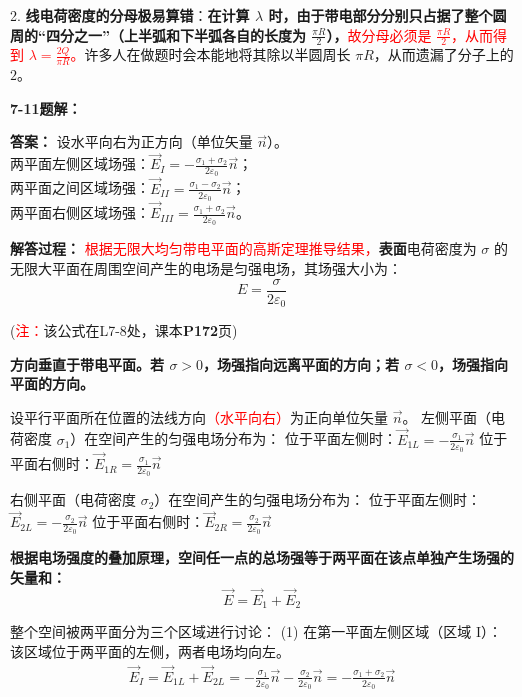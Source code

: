 2. \textbf{线电荷密度的分母极易算错}：\textbf{在计算 $\lambda$ 时，由于带电部分分别只占据了整个圆周的“四分之一”（上半弧和下半弧各自的长度为 $\frac{\pi R}{2}$），}\textcolor{red}{故分母必须是 $\frac{\pi R}{2}$，从而得到 $\lambda = \frac{2Q}{\pi R}$。}许多人在做题时会本能地将其除以半圆周长 $\pi R$，从而遗漏了分子上的 $2$。

\vspace{2em}

\textbf{7-11题解： }
\setcounter{equation}{0}
\renewcommand{\theHequation}{7-11.\arabic{equation}}

\textbf{答案： }
设水平向右为正方向（单位矢量 $\vec{n}$）。\\
两平面左侧区域场强：$\vec{E}_I = -\frac{\sigma_1 + \sigma_2}{2\varepsilon_0}\vec{n}$；\\
两平面之间区域场强：$\vec{E}_{II} = \frac{\sigma_1 - \sigma_2}{2\varepsilon_0}\vec{n}$；\\
两平面右侧区域场强：$\vec{E}_{III} = \frac{\sigma_1 + \sigma_2}{2\varepsilon_0}\vec{n}$。

\textbf{解答过程： }
\textcolor{red}{根据无限大均匀带电平面的高斯定理推导结果，}\textbf{表面}电荷密度为 $\sigma$ 的无限大平面在周围空间产生的电场是匀强电场，其场强大小为：
\begin{equation}\label{eq:7-11-1}
	E = \frac{\sigma}{2\varepsilon_0}
\end{equation}

(\textcolor{red}{注：}该公式在L7-8处，课本\textbf{P172}页)

\textbf{方向垂直于带电平面。若 $\sigma > 0$，场强指向远离平面的方向；若 $\sigma < 0$，场强指向平面的方向。}

设平行平面所在位置的法线方向\textcolor{red}{（水平向右）}为正向单位矢量 $\vec{n}$。
左侧平面（电荷密度 $\sigma_1$）在空间产生的匀强电场分布为：
位于平面左侧时：$\vec{E}_{1L} = -\frac{\sigma_1}{2\varepsilon_0}\vec{n}$
位于平面右侧时：$\vec{E}_{1R} = \frac{\sigma_1}{2\varepsilon_0}\vec{n}$

右侧平面（电荷密度 $\sigma_2$）在空间产生的匀强电场分布为：
位于平面左侧时：$\vec{E}_{2L} = -\frac{\sigma_2}{2\varepsilon_0}\vec{n}$
位于平面右侧时：$\vec{E}_{2R} = \frac{\sigma_2}{2\varepsilon_0}\vec{n}$

\textbf{根据电场强度的叠加原理，空间任一点的总场强等于两平面在该点单独产生场强的矢量和：}
\begin{equation}\label{eq:7-11-2}
	\vec{E} = \vec{E}_1 + \vec{E}_2
\end{equation}

整个空间被两平面分为三个区域进行讨论：
(1) 在第一平面左侧区域（区域 I）：该区域位于两平面的左侧，两者电场均向左。
\begin{align*}
	\vec{E}_I = \vec{E}_{1L} + \vec{E}_{2L} = -\frac{\sigma_1}{2\varepsilon_0}\vec{n} - \frac{\sigma_2}{2\varepsilon_0}\vec{n} = -\frac{\sigma_1 + \sigma_2}{2\varepsilon_0}\vec{n}
\end{align*}

